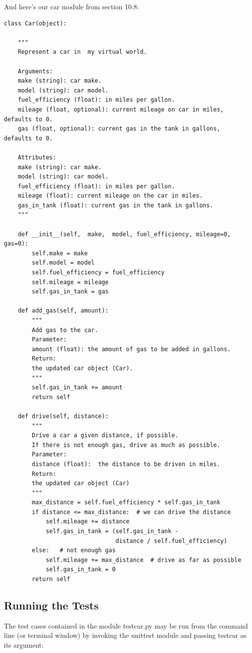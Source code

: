 \documentclass{article}
\begin{document}
And here's our car module from section 10.8:
\begin{lstlisting}
class Car(object):

    """
    Represent a car in  my virtual world.

    Arguments:
    make (string): car make.
    model (string): car model.
    fuel_efficiency (float): in miles per gallon.
    mileage (float, optional): current mileage on car in miles, defaults to 0.
    gas (float, optional): current gas in the tank in gallons, defaults to 0.

    Attributes:
    make (string): car make.
    model (string): car model.
    fuel_efficiency (float): in miles per gallon.
    mileage (float): current mileage on the car in miles.
    gas_in_tank (float): current gas in the tank in gallons.
    """

    def __init__(self,  make,  model, fuel_efficiency, mileage=0, gas=0):
        self.make = make
        self.model = model
        self.fuel_efficiency = fuel_efficiency
        self.mileage = mileage
        self.gas_in_tank = gas

    def add_gas(self, amount):
        """
        Add gas to the car.
        Parameter:
        amount (float): the amount of gas to be added in gallons.
        Return:
        the updated car object (Car).
        """
        self.gas_in_tank += amount
        return self

    def drive(self, distance):
        """
        Drive a car a given distance, if possible.
        If there is not enough gas, drive as much as possible.
        Parameter:
        distance (float):  the distance to be driven in miles.
        Return:
        the updated car object (Car)
        """
        max_distance = self.fuel_efficiency * self.gas_in_tank
        if distance <= max_distance:  # we can drive the distance
            self.mileage += distance
            self.gas_in_tank = (self.gas_in_tank - 
                                distance / self.fuel_efficiency)
        else:   # not enough gas
            self.mileage += max_distance  # drive as far as possible
            self.gas_in_tank = 0
        return self
\end{lstlisting}

\subsection{Running the Tests}
The test cases contained in the module testcar.py may be run from the command line (or terminal window) by invoking the unittest module and passing testcar  as its argument:
\end{document}
